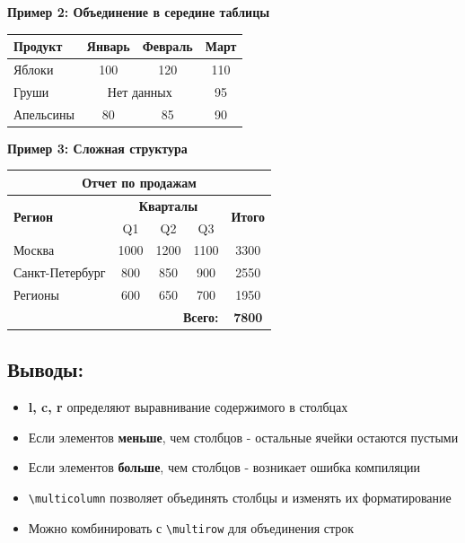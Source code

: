\documentclass[12pt,a4paper]{article}
\begin{document}
\textbf{Пример 2: Объединение в середине таблицы}

\begin{tabular}{|l|c|c|c|}
\hline
Продукт & Январь & Февраль & Март \\
\hline
Яблоки & 100 & 120 & 110 \\
\hline
Груши & \multicolumn{2}{c|}{Нет данных} & 95 \\
\hline
Апельсины & 80 & 85 & 90 \\
\hline
\end{tabular}

\vspace{1cm}

\textbf{Пример 3: Сложная структура}

\begin{tabular}{|l|c|c|c|c|}
\hline
\multicolumn{5}{|c|}{\textbf{Отчет по продажам}} \\
\hline
\multirow{2}{*}{\textbf{Регион}} & \multicolumn{3}{c|}{\textbf{Кварталы}} & \multirow{2}{*}{\textbf{Итого}} \\
\cline{2-4}
 & Q1 & Q2 & Q3 & \\
\hline
Москва & 1000 & 1200 & 1100 & 3300 \\
\hline
Санкт-Петербург & 800 & 850 & 900 & 2550 \\
\hline
Регионы & 600 & 650 & 700 & 1950 \\
\hline
\multicolumn{4}{|r|}{\textbf{Всего:}} & \textbf{7800} \\
\hline
\end{tabular}

\vspace{1cm}

\subsection*{Выводы:}

\begin{itemize}
    \item \textbf{l, c, r} определяют выравнивание содержимого в столбцах
    \item Если элементов \textbf{меньше}, чем столбцов - остальные ячейки остаются пустыми
    \item Если элементов \textbf{больше}, чем столбцов - возникает ошибка компиляции
    \item \texttt{\textbackslash multicolumn} позволяет объединять столбцы и изменять их форматирование
    \item Можно комбинировать с \texttt{\textbackslash multirow} для объединения строк
\end{itemize}
\end{document}
